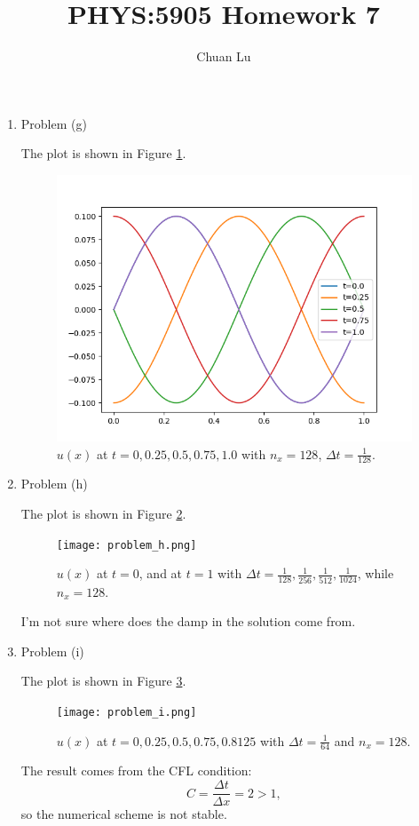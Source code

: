 \documentclass{article}
\begin{document}
\author{Chuan Lu}
\title{PHYS:5905 Homework 7}
\maketitle

\medskip

\begin{enumerate}
\item Problem (g)

The plot is shown in Figure \ref{problem (g)}.

\begin{figure}[h]
\centering
\includegraphics[scale=0.8]{problem_g.png}
\caption{$u(x) $ at $t = 0, 0.25, 0.5, 0.75, 1.0$ with $n_x = 128 $, $\Delta t = \frac{1}{128}$.}
\label{problem (g)}
\end{figure}

\item Problem (h)

The plot is shown in Figure \ref{problem (h)}.

\begin{figure}[h]
\centering
\texttt{[image: problem\_h.png]}
\caption{$u(x)$ at $t = 0$, and at $t = 1$ with $\Delta t = \frac{1}{128}, \frac{1}{256}, \frac{1}{512}, \frac{1}{1024}$, while $n_x = 128 $.}
\label{problem (h)}
\end{figure}

I'm not sure where does the damp in the solution come from.

\item Problem (i)

The plot is shown in Figure \ref{problem (i)}.

\begin{figure}[h]
\centering
\texttt{[image: problem\_i.png]}
\caption{$u(x)$ at $t = 0, 0.25, 0.5, 0.75, 0.8125$ with $\Delta t = \frac{1}{64}$ and $n_x = 128 $.}
\label{problem (i)}
\end{figure}

The result comes from the CFL condition:
$$
C = \frac{\Delta t}{\Delta x} = 2 > 1,
$$
so the numerical scheme is not stable.

\end{enumerate}
\end{document}

